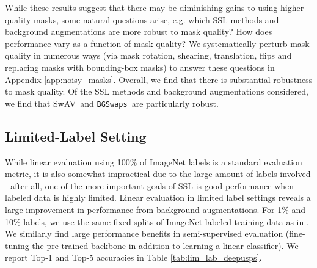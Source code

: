 \documentclass[twoside,11pt]{article}
\newcommand{\bgswaps}{\texttt{BG\textunderscore Swaps}}
\newcommand{\swav}{SwAV}
\begin{document}
While these results suggest that there may be diminishing gains to using higher quality masks, some natural questions arise, e.g. which SSL methods and background augmentations are more robust to mask quality? How does performance vary as a function of mask quality? We systematically perturb mask quality in numerous ways (via mask rotation, shearing, translation, flips and replacing masks with bounding-box masks) to answer these questions in Appendix \ref{app:noisy_masks}. Overall, we find that there is substantial robustness to mask quality. Of the SSL methods and background augmentations considered, we find that \swav~and \bgswaps~are particularly robust.


\subsection{Limited-Label Setting}

While linear evaluation using 100\% of ImageNet labels is a standard evaluation metric, it is also somewhat impractical due to the large amount of labels involved - after all, one of the more important goals of SSL is good performance when labeled data is highly limited. Linear evaluation in limited label settings reveals a large improvement in performance from background augmentations. For 1\% and 10\% labels, we use the same fixed splits of ImageNet labeled training data as in \citet{chen2020big}. We similarly find large performance benefits in semi-supervised evaluation (fine-tuning the pre-trained backbone in addition to learning a linear classifier). We report Top-1 and Top-5 accuracies in Table \ref{tab:lim_lab_deepusps}.
\end{document}
